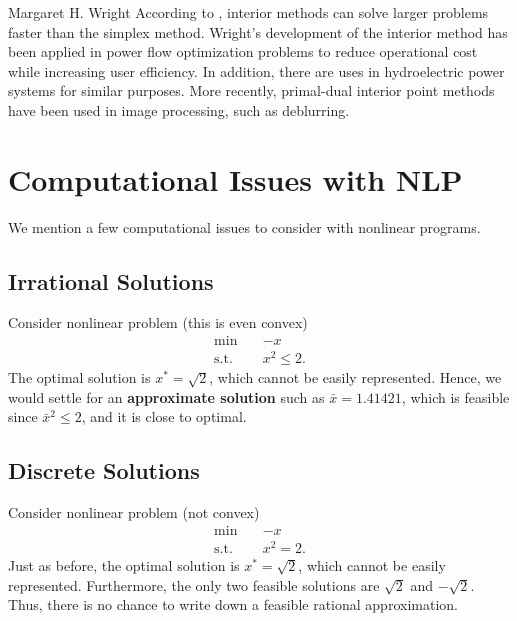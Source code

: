 \begin{refsection}
\begin{pioneerspotlight}{Margaret H. Wright}
According to \textcite{lauterio_2022_interiorpoint}, interior methods can solve larger problems faster than the simplex method. Wright’s development of the interior method has been applied in power flow optimization problems to reduce operational cost while increasing user efficiency. In addition, there are uses in hydroelectric power systems for similar purposes. More recently, primal-dual interior point methods have been used in image processing, such as deblurring. 

\printbibliography[heading=subbibliography]
\end{pioneerspotlight}
\end{refsection}


\chapter{Computational Issues with NLP}
We mention a few computational issues to consider with nonlinear programs.  
\section{Irrational Solutions}
Consider nonlinear problem (this  is even convex)
\begin{equation}
\begin{array}{rl}
\min \quad & -x\\
\text{s.t.} \quad & x^2 \leq 2.
\end{array}
\end{equation}
The optimal solution is $x^* = \sqrt{2}$, which cannot be easily represented.  Hence, we would settle for an \textbf{approximate solution} such as $\bar x = 1.41421$, which is feasible since $\bar x^2 \leq 2$, and it is close to optimal.

\section{Discrete Solutions}
Consider nonlinear problem (not convex)
\begin{equation}
\begin{array}{rl}
\min \quad & -x\\
\text{s.t.} \quad & x^2 = 2.
\end{array}
\end{equation}
Just as before, the optimal solution is $x^* = \sqrt{2}$, which cannot be easily represented.  Furthermore, the only two feasible solutions are $\sqrt{2}$ and $-\sqrt{2}$.  Thus, there is no chance to write down a feasible rational approximation.

